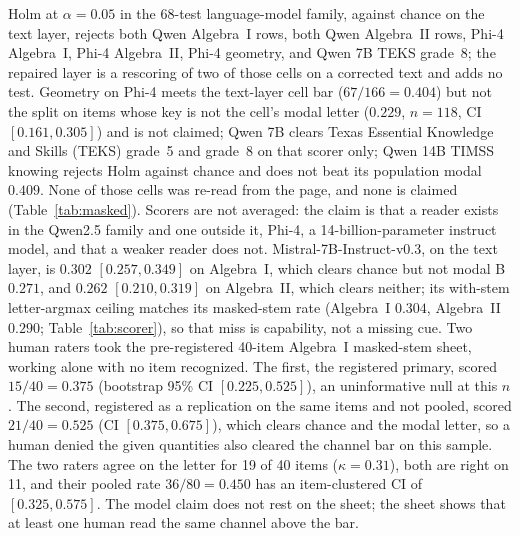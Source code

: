Holm at $\alpha=0.05$ in the 68-test language-model family, against chance on the text layer, rejects both Qwen Algebra~I rows, both Qwen Algebra~II rows, Phi-4 Algebra~I, Phi-4 Algebra~II, Phi-4 geometry, and Qwen 7B TEKS grade~8; the repaired layer is a rescoring of two of those cells on a corrected text and adds no test. Geometry on Phi-4 meets the text-layer cell bar ($67/166=0.404$) but not the split on items whose key is not the cell's modal letter ($0.229$, $n=118$, CI $[0.161, 0.305]$) and is not claimed; Qwen 7B clears Texas Essential Knowledge and Skills (TEKS) grade~5 and grade~8 on that scorer only; Qwen 14B TIMSS knowing rejects Holm against chance and does not beat its population modal $0.409$. None of those cells was re-read from the page, and none is claimed (Table~\ref{tab:masked}). Scorers are not averaged: the claim is that a reader exists in the Qwen2.5 family and one outside it, Phi-4, a 14-billion-parameter instruct model, and that a weaker reader does not. Mistral-7B-Instruct-v0.3, on the text layer, is $0.302$ $[0.257, 0.349]$ on Algebra~I, which clears chance but not modal B $0.271$, and $0.262$ $[0.210, 0.319]$ on Algebra~II, which clears neither; its with-stem letter-argmax ceiling matches its masked-stem rate (Algebra~I $0.304$, Algebra~II $0.290$; Table~\ref{tab:scorer}), so that miss is capability, not a missing cue. Two human raters took the pre-registered 40-item Algebra~I masked-stem sheet, working alone with no item recognized. The first, the registered primary, scored $15/40=0.375$ (bootstrap 95\% CI $[0.225, 0.525]$), an uninformative null at this $n$. The second, registered as a replication on the same items and not pooled, scored $21/40=0.525$ (CI $[0.375, 0.675]$), which clears chance and the modal letter, so a human denied the given quantities also cleared the channel bar on this sample. The two raters agree on the letter for 19 of 40 items ($\kappa=0.31$), both are right on 11, and their pooled rate $36/80=0.450$ has an item-clustered CI of $[0.325, 0.575]$. The model claim does not rest on the sheet; the sheet shows that at least one human read the same channel above the bar.

